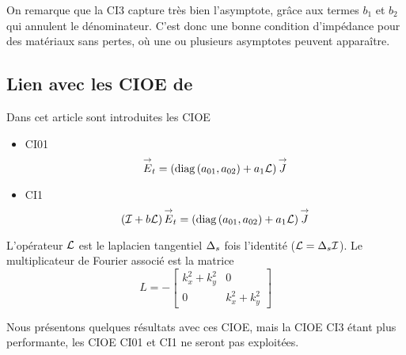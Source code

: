       On remarque que la CI3 capture très bien l'asymptote, grâce aux termes \(b_1\) et \(b_2\) qui annulent le dénominateur. C'est donc une bonne condition d'impédance pour des matériaux sans pertes, où une ou plusieurs asymptotes peuvent apparaître.

  \subsection{Lien avec les CIOE de \cite{stupfel_implementation_2015}}

    Dans cet article sont introduites les CIOE
    \begin{itemize}
      \item CI01
        \begin{equation}
          {\overset{\rightarrow}{E}}_t = \left(\operatorname{diag}\left(a_{01},a_{02}\right) + a_1\mathcal{L}\right){\overset{\rightarrow}{J}}
        \end{equation}
      \item CI1
        \begin{equation}
          \left({\mathcal{I}} + b\mathcal{L} \right){\overset{\rightarrow}{E}}_t = \left(\operatorname{diag}\left(a_{01},a_{02}\right) + a_1\mathcal{L}\right){\overset{\rightarrow}{J}}
        \end{equation}
    \end{itemize}

    L'opérateur \(\mathcal{L}\) est le laplacien tangentiel \(\Delta_s\) fois l'identité (\(\mathcal{L} = \Delta_s{}{\mathcal{I}}\)). Le multiplicateur de Fourier associé est la matrice
    \begin{equation}
      L = -
      \begin{bmatrix}
        k_x^2 + k_y^2 & 0
        \\
        0 & k_x^2 + k_y^2
      \end{bmatrix}
    \end{equation}

    Nous présentons quelques résultats avec ces CIOE, mais la CIOE CI3 étant plus performante, les CIOE CI01 et CI1 ne seront pas exploitées.

